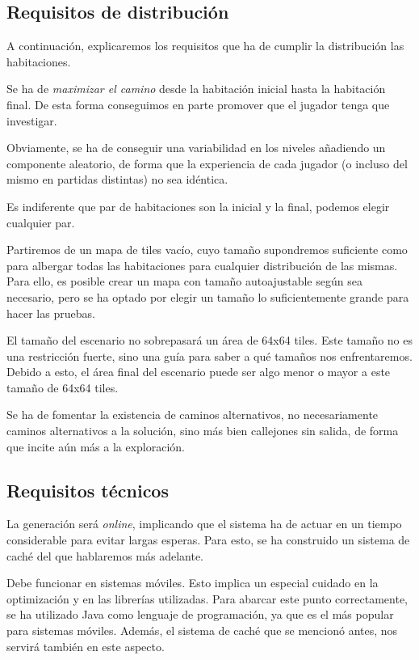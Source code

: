 \subsection{Requisitos de distribución}

A continuación, explicaremos los requisitos que ha de cumplir la distribución las habitaciones.

Se ha de \emph{maximizar el camino} desde la habitación inicial hasta la habitación final. De esta forma conseguimos en parte promover que el jugador tenga que investigar.

Obviamente, se ha de conseguir una variabilidad en los niveles añadiendo un componente aleatorio, de forma que la experiencia de cada jugador (o incluso del mismo en partidas distintas) no sea idéntica.

Es indiferente que par de habitaciones son la inicial y la final, podemos elegir cualquier par.

Partiremos de un mapa de tiles vacío, cuyo tamaño supondremos suficiente como para albergar todas las habitaciones para cualquier distribución de las mismas. Para ello, es posible crear un mapa con tamaño autoajustable según sea necesario, pero se ha optado por elegir un tamaño lo suficientemente grande para hacer las pruebas.

El tamaño del escenario no sobrepasará un área de 64x64 tiles. Este tamaño no es una restricción fuerte, sino una guía para saber a qué tamaños nos enfrentaremos. Debido a esto, el área final del escenario puede ser algo menor o mayor a este tamaño de 64x64 tiles.

Se ha de fomentar la existencia de caminos alternativos, no necesariamente caminos alternativos a la solución, sino más bien callejones sin salida, de forma que incite aún más a la exploración.

\subsection{Requisitos técnicos}

La generación será \emph{online}, implicando que el sistema ha de actuar en un tiempo considerable para evitar largas esperas. Para esto, se ha construido un sistema de caché del que hablaremos más adelante.

Debe funcionar en sistemas móviles. Esto implica un especial cuidado en la optimización y en las librerías utilizadas. Para abarcar este punto correctamente, se ha utilizado Java como lenguaje de programación, ya que es el más popular para sistemas móviles. Además, el sistema de caché que se mencionó antes, nos servirá también en este aspecto.




